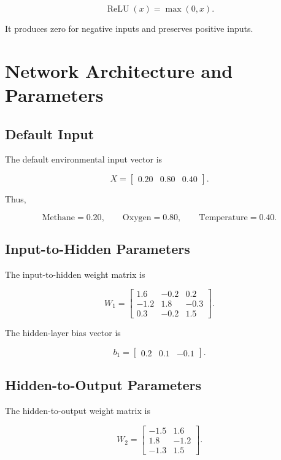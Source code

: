 \documentclass[12pt]{article}
\begin{document}
\[
\operatorname{ReLU}(x)=\max(0,x).
\]

It produces zero for negative inputs and preserves positive inputs.


\section{Network Architecture and Parameters}

\subsection{Default Input}

The default environmental input vector is

\[
X =
\begin{bmatrix}
0.20 & 0.80 & 0.40
\end{bmatrix}.
\]

Thus,

\[
\text{Methane}=0.20,
\qquad
\text{Oxygen}=0.80,
\qquad
\text{Temperature}=0.40.
\]

\subsection{Input-to-Hidden Parameters}

The input-to-hidden weight matrix is

\[
W_1 =
\begin{bmatrix}
1.6 & -0.2 & 0.2\\
-1.2 & 1.8 & -0.3\\
0.3 & -0.2 & 1.5
\end{bmatrix}.
\]

The hidden-layer bias vector is

\[
b_1 =
\begin{bmatrix}
0.2 & 0.1 & -0.1
\end{bmatrix}.
\]

\subsection{Hidden-to-Output Parameters}

The hidden-to-output weight matrix is

\[
W_2 =
\begin{bmatrix}
-1.5 & 1.6\\
1.8 & -1.2\\
-1.3 & 1.5
\end{bmatrix}.
\]
\end{document}
